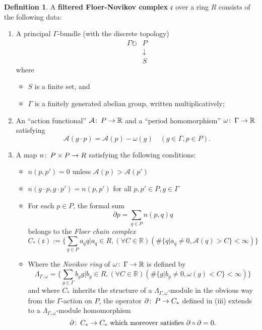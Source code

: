 \documentclass{amsart}
\theoremstyle{plain}
\theoremstyle{definition}
\newtheorem{definition}[theorem]{Definition}
\theoremstyle{remark}
\def\co{\colon\thinspace}
\begin{document}
\begin{definition} A \textbf{filtered Floer-Novikov complex} $\mathfrak{c}$  over a ring $R$ consists of the following data:\begin{enumerate}
\item[(1)] A principal $\Gamma$-bundle (with the discrete topology) \begin{align*} \Gamma\circlearrowright & P \\ & \downarrow \\ & S\end{align*}
where \begin{itemize} \item[(i)] $S$ is a finite set, and \item[(ii)] $\Gamma$ is a finitely generated  abelian group, written multiplicatively;\end{itemize}
\item[(2)] An ``action functional'' $\mathcal{A}\co P\to \mathbb{R}$ and a ``period homomorphism'' $\omega\co \Gamma\to \mathbb{R}$ satisfying \[ \mathcal{A}(g\cdot p)=\mathcal{A}(p)-\omega(g) \quad (g\in \Gamma,p\in P).\]
\item[(3)] A map $n\co P\times P\to R$ satisfying the following conditions: 
\begin{itemize}\item[(i)] $n(p,p')=0$ unless  $\mathcal{A}(p)>\mathcal{A}(p')$%
\item[(ii)] $n(g\cdot p,g\cdot p')=n(p,p')$ for all $p,p'\in P,g\in \Gamma$
\item[(iii)] For each $p\in P$, the formal sum \[ \partial p=\sum_{q\in P}n(p,q)q\] belongs to the \emph{Floer chain complex} \[ C_*(\mathfrak{c}):=\big\{\sum_{q\in P}a_qq|a_q\in R,(\forall C\in\mathbb{R})(\#\{q|a_q\neq 0,\mathcal{A}(q)>C\}<\infty) \big\}\]
\item[(iv)] Where the \emph{Novikov ring} of $\omega\co\Gamma\to\mathbb{R}$ is defined by \[ \Lambda_{\Gamma,\omega}=\big\{\sum_{g\in \Gamma}b_gg|b_g\in R,(\forall C\in\mathbb{R})(\#\{g|b_g\neq 0,\omega(g)<C\}<\infty)\big\}\] 
and where $C_*$ inherits the structure of a $\Lambda_{\Gamma,\omega}$-module in the obvious way from the $\Gamma$-action on $P$, the operator $\partial\co P\to C_*$ defined in (iii) extends to a 
$\Lambda_{\Gamma,\omega}$-module homomorphism  \[ \partial\co C_*\to C_* \mbox{  which moreover satisfies } \partial\circ\partial=0.\]
\end{itemize}
\end{enumerate}
\end{definition}
\end{document}

